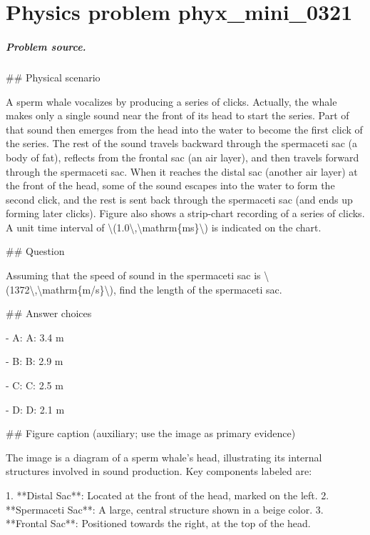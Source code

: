 
\chapter{Physics problem phyx\_mini\_0321}
\label{ch:PhyXMiniProblems_problem_phyx_mini_0321}

\paragraph{Problem source.}
\#\# Physical scenario

A sperm whale vocalizes by producing a series of clicks. Actually, the whale makes only a single sound near the front of its head to start the series. Part of that sound then emerges from the head into the water to become the first click of the series. The rest of the sound travels backward through the spermaceti sac (a body of fat), reflects from the frontal sac (an air layer), and then travels forward through the spermaceti sac. When it reaches the distal sac (another air layer) at the front of the head, some of the sound escapes into the water to form the second click, and the rest is sent back through the spermaceti sac (and ends up forming later clicks). Figure also shows a strip-chart recording of a series of clicks. A unit time interval of \textbackslash{}(1.0\textbackslash{},\textbackslash{}mathrm\{ms\}\textbackslash{}) is indicated on the chart.

\#\# Question

Assuming that the speed of sound in the spermaceti sac is \textbackslash{}(1372\textbackslash{},\textbackslash{}mathrm\{m/s\}\textbackslash{}), find the length of the spermaceti sac.

\#\# Answer choices

- A: A: 3.4 m

- B: B: 2.9 m

- C: C: 2.5 m

- D: D: 2.1 m

\#\# Figure caption (auxiliary; use the image as primary evidence)

The image is a diagram of a sperm whale's head, illustrating its internal structures involved in sound production. Key components labeled are:

1. **Distal Sac**: Located at the front of the head, marked on the left.
2. **Spermaceti Sac**: A large, central structure shown in a beige color.
3. **Frontal Sac**: Positioned towards the right, at the top of the head.

